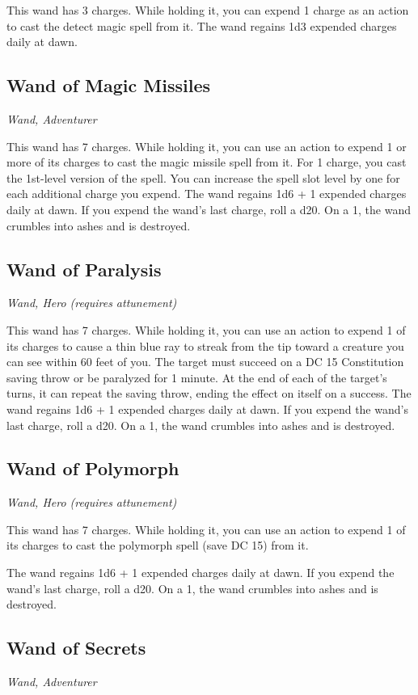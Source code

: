 This wand has 3 charges. While holding it, you can expend 1 charge as an action to cast the detect magic spell from it. The wand regains 1d3 expended charges daily at dawn.

\subsection{Wand of Magic Missiles}
\textit{Wand, Adventurer} 

This wand has 7 charges. While holding it, you can use an action to expend 1 or more of its charges to cast the magic missile spell from it. For 1 charge, you cast the 1st-level version of the spell. You can increase the spell slot level by one for each additional charge you expend. The wand regains 1d6 + 1 expended charges daily at dawn. If you expend the wand's last charge, roll a d20. On a 1, the wand crumbles into ashes and is destroyed.

\subsection{Wand of Paralysis}
\textit{Wand, Hero (requires attunement)} 

This wand has 7 charges. While holding it, you can use an action to expend 1 of its charges to cause a thin blue ray to streak from the tip toward a creature you can see within 60 feet of you. The target must succeed on a DC 15 Constitution saving throw or be paralyzed for 1 minute. At the end of each of the target's turns, it can repeat the saving throw, ending the effect on itself on a success.  The wand regains 1d6 + 1 expended charges daily at dawn. If you expend the wand's last charge, roll a d20. On a 1, the wand crumbles into ashes and is destroyed.

\subsection{Wand of Polymorph}
\textit{Wand, Hero (requires attunement)}

This wand has 7 charges. While holding it, you can use an action to expend 1 of its charges to cast the polymorph spell (save DC 15) from it.

The wand regains 1d6 + 1 expended charges daily at dawn. If you expend the wand's last charge, roll a d20. On a 1, the wand crumbles into ashes and is destroyed.

\subsection{Wand of Secrets}
\textit{Wand, Adventurer}

